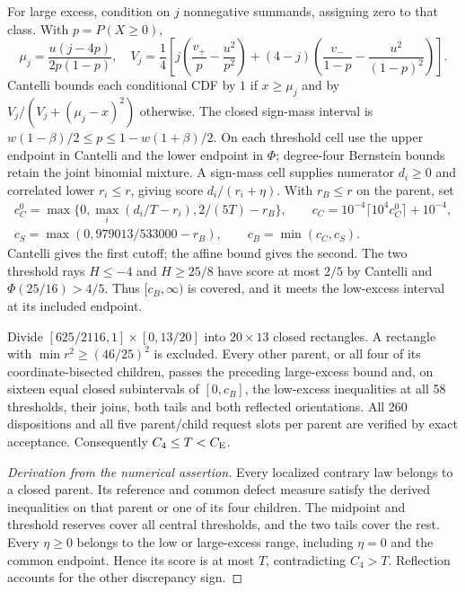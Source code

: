 For large excess, condition on $j$ nonnegative summands, assigning
zero to that class. With $p=P(X\ge0)$,
\[
 \mu_j=\frac{u(j-4p)}{2p(1-p)},\quad
 V_j=\frac14\left[j\left(\frac{v_+}{p}-\frac{u^2}{p^2}\right)
 +(4-j)\left(\frac{v_-}{1-p}-\frac{u^2}{(1-p)^2}\right)\right].
\]
Cantelli bounds each conditional CDF by $1$ if $x\ge\mu_j$ and by
$V_j/(V_j+(\mu_j-x)^2)$ otherwise. The closed sign-mass interval is
$w(1-\beta)/2\le p\le1-w(1+\beta)/2$.
On each threshold cell use the upper endpoint in Cantelli and the
lower endpoint in $\Phi$; degree-four Bernstein bounds retain the
joint binomial mixture. A sign-mass cell supplies numerator $d_i\ge0$
and correlated lower $r_i\le r$, giving score $d_i/(r_i+\eta)$.
With $r_B\le r$ on the parent, set
\begin{gather*}
 c_C^0=\max\{0,\max_i(d_i/T-r_i),2/(5T)-r_B\},\qquad
 c_C=10^{-4}\lceil10^4c_C^0\rceil+10^{-4},\\
 c_S=\max(0,979013/533000-r_B),\qquad c_B=\min(c_C,c_S).
\end{gather*}
Cantelli gives the first cutoff; the affine bound gives the second.
The two threshold rays $H\le-4$ and $H\ge25/8$ have score at most
$2/5$ by Cantelli and $\Phi(25/16)>4/5$. Thus $[c_B,\infty)$ is
covered, and it meets the low-excess interval at its included endpoint.

\begin{proposition}\label{j:finite:n4numerical}
Divide $[625/2116,1]\times[0,13/20]$ into $20\times13$ closed
rectangles. A rectangle with $\min r^2\ge(46/25)^2$ is excluded.
Every other parent, or all four of its coordinate-bisected children,
passes the preceding large-excess bound and, on sixteen equal closed
subintervals of $[0,c_B]$, the low-excess inequalities at all 58
thresholds, their joins, both tails and both reflected orientations.
All 260 dispositions and all five parent/child request slots per parent
are verified by exact acceptance. Consequently $C_4\le T<C_{\mathrm E}$.
\end{proposition}
\begin{proof}[Derivation from the numerical assertion]
Every localized contrary law belongs to a closed parent. Its reference
and common defect measure satisfy the derived inequalities on that parent
or one of its four children. The midpoint and threshold reserves cover
all central thresholds, and the two tails cover the rest.
Every $\eta\ge0$ belongs to the low or large-excess range, including
$\eta=0$ and the common endpoint. Hence its score is at most $T$,
contradicting $C_4>T$. Reflection accounts for the other discrepancy sign.
\end{proof}

